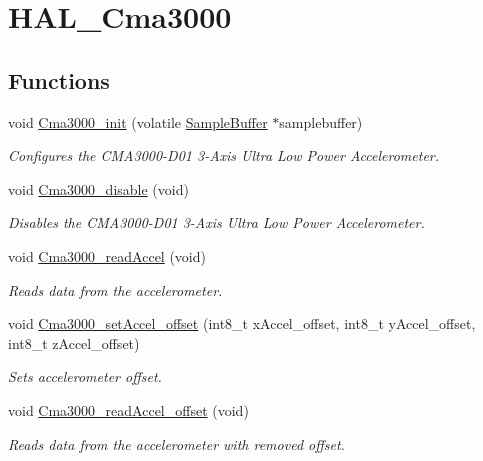 \hypertarget{group__HAL__Cma3000}{\section{H\-A\-L\-\_\-\-Cma3000}
\label{group__HAL__Cma3000}
}
\subsection*{Functions}
\begin{DoxyCompactItemize}
\item 
void \hyperlink{group__HAL__Cma3000_gac439f32a065c427ffa5df446dd4c67ca}{Cma3000\-\_\-init} (volatile \hyperlink{structSampleBuffer}{Sample\-Buffer} $\ast$samplebuffer)
\begin{DoxyCompactList}\small\item\em Configures the C\-M\-A3000-\/\-D01 3-\/\-Axis Ultra Low Power Accelerometer. \end{DoxyCompactList}\item 
void \hyperlink{group__HAL__Cma3000_ga995a83248eda64e38272b13d65adfdd7}{Cma3000\-\_\-disable} (void)
\begin{DoxyCompactList}\small\item\em Disables the C\-M\-A3000-\/\-D01 3-\/\-Axis Ultra Low Power Accelerometer. \end{DoxyCompactList}\item 
void \hyperlink{group__HAL__Cma3000_ga026e2b2fc4fa23ab54d57c8e9f43cb16}{Cma3000\-\_\-read\-Accel} (void)
\begin{DoxyCompactList}\small\item\em Reads data from the accelerometer. \end{DoxyCompactList}\item 
void \hyperlink{group__HAL__Cma3000_ga1cff4c7c212e66af14b2c607dc420e33}{Cma3000\-\_\-set\-Accel\-\_\-offset} (int8\-\_\-t x\-Accel\-\_\-offset, int8\-\_\-t y\-Accel\-\_\-offset, int8\-\_\-t z\-Accel\-\_\-offset)
\begin{DoxyCompactList}\small\item\em Sets accelerometer offset. \end{DoxyCompactList}\item 
void \hyperlink{group__HAL__Cma3000_gae35d5bf91afe0aac0557c10c5446680c}{Cma3000\-\_\-read\-Accel\-\_\-offset} (void)
\begin{DoxyCompactList}\small\item\em Reads data from the accelerometer with removed offset. \end{DoxyCompactList}\item 

\end{DoxyCompactItemize}
